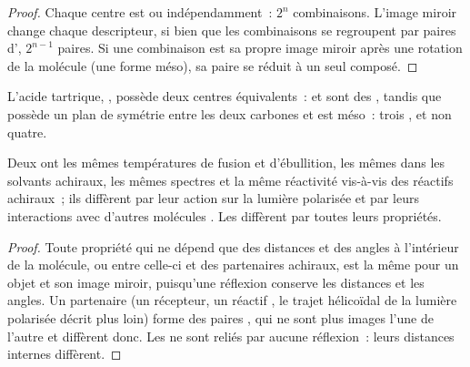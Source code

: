 \begin{proof}
Chaque centre est  ou  indépendamment~: $2^n$
combinaisons. L'image miroir change chaque descripteur, si bien que les
combinaisons se regroupent par paires d', $2^{n-1}$ paires.
Si une combinaison est sa propre image miroir après une rotation de la
molécule (une forme méso), sa paire se réduit à un seul composé.
\end{proof}

L'acide tartrique, , possède deux centres
équivalents~:  et  sont des , tandis que
 possède un plan de symétrie entre les deux carbones et est
méso~: trois , et non quatre.

\begin{proposition}\label{prop:b1:stereochemistry-in-depth:enantiomer-properties}
Deux  ont les mêmes températures de fusion et d'ébullition,
les mêmes  dans les solvants achiraux, les mêmes spectres et
la même réactivité vis-à-vis des réactifs achiraux~; ils diffèrent par
leur action sur la lumière polarisée et par leurs interactions avec
d'autres molécules . Les  diffèrent par toutes
leurs propriétés.
\end{proposition}

\begin{proof}
Toute propriété qui ne dépend que des distances et des angles à
l'intérieur de la molécule, ou entre celle-ci et des partenaires
achiraux, est la même pour un objet et son image miroir, puisqu'une
réflexion conserve les distances et les angles. Un partenaire  (un
récepteur, un réactif , le trajet hélicoïdal de la lumière
polarisée décrit plus loin) forme des paires , qui ne
sont plus images l'une de l'autre et diffèrent donc. Les
 ne sont reliés par aucune réflexion~: leurs distances
internes diffèrent.
\end{proof}

